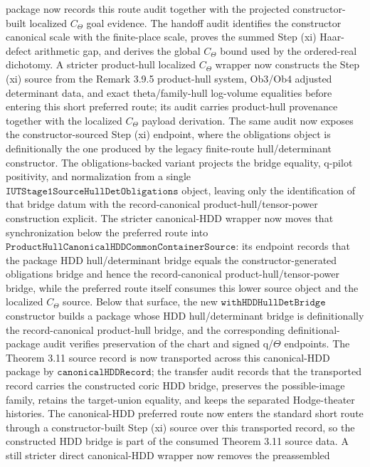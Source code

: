 \documentclass[11pt]{article}
\theoremstyle{plain}
\theoremstyle{definition}
\theoremstyle{remark}
\begin{document}
  package now records this route audit together with the projected
  constructor-built localized \(C_\Theta\) goal evidence.  The handoff audit identifies
  the constructor canonical scale with the finite-place scale, proves the summed
  Step (xi) Haar-defect
arithmetic gap, and derives the global \(C_\Theta\) bound used by the
ordered-real dichotomy.  A stricter product-hull localized
\(C_\Theta\) wrapper now constructs the Step (xi) source from the
Remark 3.9.5 product-hull system, Ob3/Ob4 adjusted determinant data, and exact
theta/family-hull log-volume equalities before entering this short preferred
route; its audit carries product-hull provenance together with the localized
\(C_\Theta\) payload derivation.  The same audit now exposes the
constructor-sourced Step (xi) endpoint, where the obligations object is
definitionally the one produced by the legacy finite-route
hull/determinant constructor.  The obligations-backed variant projects the
bridge equality, q-pilot positivity, and normalization from a single
\(\texttt{IUTStage1SourceHullDetObligations}\) object, leaving only the
identification of that bridge datum with the record-canonical
product-hull/tensor-power construction explicit.  The stricter canonical-HDD
wrapper now moves that synchronization below the preferred route into
\(\texttt{ProductHullCanonicalHDDCommonContainerSource}\): its endpoint records
that the package HDD hull/determinant bridge equals the constructor-generated
obligations bridge and hence the record-canonical product-hull/tensor-power
bridge, while the preferred route itself consumes this lower source object and
the localized \(C_\Theta\) source.  Below that surface, the new
\(\texttt{withHDDHullDetBridge}\) constructor builds a package whose HDD
hull/determinant bridge is definitionally the record-canonical product-hull
bridge, and the corresponding definitional-package audit verifies preservation
of the chart and signed q/\(\Theta\) endpoints.  The Theorem 3.11 source record
is now transported across this canonical-HDD package by
\(\texttt{canonicalHDDRecord}\); the transfer audit records that the transported
record carries the constructed coric HDD bridge, preserves the possible-image
family, retains the target-union equality, and keeps the separated
Hodge-theater histories.  The canonical-HDD preferred route now enters the
standard short route through a constructor-built Step (xi) source over this
transported record, so the constructed HDD bridge is part of the consumed
Theorem 3.11 source data.  A still stricter direct canonical-HDD wrapper now
removes the preassembled
\end{document}
